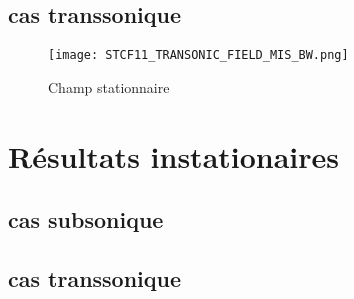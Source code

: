 \subsection{cas transsonique}

\begin{figure}[htbp]
  \centering
  \texttt{[image: STCF11\_TRANSONIC\_FIELD\_MIS\_BW.png]}
  \caption{Champ stationnaire}
  \label{fig:stcf11_rans_2D_transonic}
\end{figure}

\section{Résultats instationaires}

\subsection{cas subsonique}

\subsection{cas transsonique}



